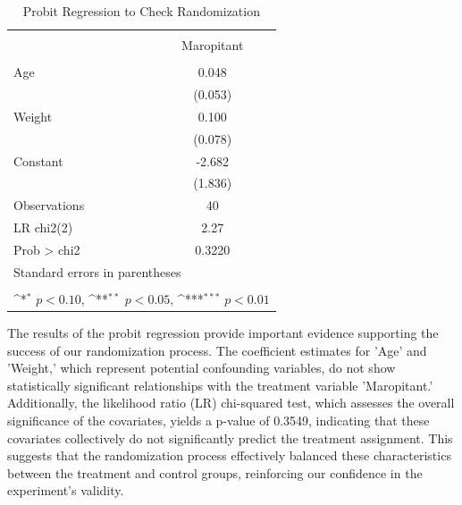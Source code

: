 \documentclass{article}
\newcommand{\sym}[1]{%
  \ifmmode^{#1}\else\(^{#1}\)\fi%
}
\begin{document}
\begin{table}[htbp]
    \centering
    \caption{Probit Regression to Check Randomization}
    \begin{tabular}{l*{1}{c}}
        \toprule
                            &\\
                            &\multicolumn{1}{c}{Maropitant}\\
        \midrule
                &                     \\
        Age                 & 0.048               \\
                            & (0.053)             \\
        \addlinespace
        Weight              & 0.100               \\
                            & (0.078)             \\
        \addlinespace
        Constant            & -2.682              \\
                            & (1.836)             \\
        \midrule
        Observations        & 40                  \\
        LR chi2(2)          &      2.27             \\
        Prob > chi2         &   0.3220              \\
        \bottomrule
        \multicolumn{2}{l}{\footnotesize Standard errors in parentheses}\\
        \multicolumn{2}{l}{\footnotesize  }\\
        \multicolumn{2}{l}{\footnotesize \sym{*} \(p<0.10\), \sym{**} \(p<0.05\), \sym{***} \(p<0.01\)}\\
    \end{tabular}
\end{table}
    
The results of the probit regression provide important evidence supporting the success of our randomization process.
The coefficient estimates for 'Age' and 'Weight,' which represent potential confounding variables, do not show
statistically significant relationships with the treatment variable 'Maropitant.' Additionally, the likelihood ratio
(LR) chi-squared test, which assesses the overall significance of the covariates, yields a p-value of 0.3549,
indicating that these covariates collectively do not significantly predict the treatment assignment. This suggests
that the randomization process effectively balanced these characteristics between the treatment and control groups,
reinforcing our confidence in the experiment's validity.
    
\end{document}
